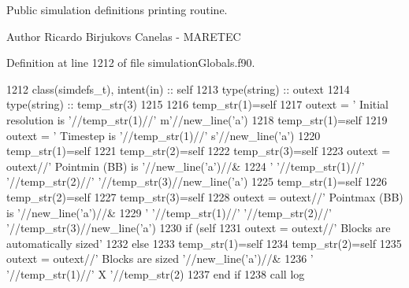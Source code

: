 Public simulation definitions printing routine. 

\begin{DoxyAuthor}{Author}
Ricardo Birjukovs Canelas -\/ M\+A\+R\+E\+T\+EC 
\end{DoxyAuthor}


Definition at line 1212 of file simulation\+Globals.\+f90.


\begin{DoxyCode}
1212     \textcolor{keywordtype}{class}(simdefs\_t), \textcolor{keywordtype}{intent(in)} :: self
1213     \textcolor{keywordtype}{type}(string) :: outext
1214     \textcolor{keywordtype}{type}(string) :: temp\_str(3)
1215 
1216     temp\_str(1)=self%
1217     outext = \textcolor{stringliteral}{'      Initial resolution is '}//temp\_str(1)//\textcolor{stringliteral}{' m'}//new\_line(\textcolor{stringliteral}{'a'})
1218     temp\_str(1)=self%
1219     outext = \textcolor{stringliteral}{'      Timestep is '}//temp\_str(1)//\textcolor{stringliteral}{' s'}//new\_line(\textcolor{stringliteral}{'a'})
1220     temp\_str(1)=self%
1221     temp\_str(2)=self%
1222     temp\_str(3)=self%
1223     outext = outext//\textcolor{stringliteral}{'       Pointmin (BB) is '}//new\_line(\textcolor{stringliteral}{'a'})//&
1224         \textcolor{stringliteral}{'       '}//temp\_str(1)//\textcolor{stringliteral}{' '}//temp\_str(2)//\textcolor{stringliteral}{' '}//temp\_str(3)//new\_line(\textcolor{stringliteral}{'a'})
1225     temp\_str(1)=self%
1226     temp\_str(2)=self%
1227     temp\_str(3)=self%
1228     outext = outext//\textcolor{stringliteral}{'       Pointmax (BB) is '}//new\_line(\textcolor{stringliteral}{'a'})//&
1229         \textcolor{stringliteral}{'       '}//temp\_str(1)//\textcolor{stringliteral}{' '}//temp\_str(2)//\textcolor{stringliteral}{' '}//temp\_str(3)//new\_line(\textcolor{stringliteral}{'a'})
1230     \textcolor{keywordflow}{if} (self%
1231         outext = outext//\textcolor{stringliteral}{'       Blocks are automatically sized'}
1232     \textcolor{keywordflow}{else}
1233         temp\_str(1)=self%
1234         temp\_str(2)=self%
1235         outext = outext//\textcolor{stringliteral}{'       Blocks are sized '}//new\_line(\textcolor{stringliteral}{'a'})//&
1236             \textcolor{stringliteral}{'       '}//temp\_str(1)//\textcolor{stringliteral}{' X '}//temp\_str(2)
1237 \textcolor{keywordflow}{    end if}
1238     \textcolor{keyword}{call }log%
\end{DoxyCode}
\mbox{\label{namespacesimulationglobals__mod_ab67964fe7c3fb20a4ce0b4193520aa1d}} 
